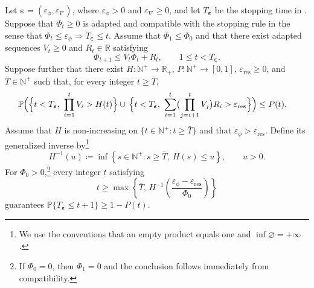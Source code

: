 \documentclass{article}
\begin{document}
\begin{theorem}
\label{Big_threorem}
Let
\(\boldsymbol\varepsilon=(\varepsilon_\phi,\varepsilon_\nabla)\), where
\(\varepsilon_\phi>0\) and \(\varepsilon_\nabla\ge0\), and let
\(T_{\boldsymbol\varepsilon}\) be the stopping time in
.  Suppose that \(\Phi_t\ge0\) is adapted and
compatible with the stopping rule in the sense that
$\Phi_t\le\varepsilon_\phi
\Longrightarrow
T_{\boldsymbol\varepsilon}\le t$.
Assume that \(\Phi_1\le\Phi_0\) and that there exist adapted sequences
\(V_t\ge0\) and \(R_t\in\mathbb R\) satisfying
\begin{equation}\label{eq:abstract_one_step}
\Phi_{t+1}\le V_t\Phi_t+R_t,
\qquad 1\le t<T_{\boldsymbol\varepsilon}.
\end{equation}
Suppose further that there exist
\(H\colon \mathbb N^+\to\mathbb R_+\),
\(P\colon \mathbb N^+\to[0,1]\),
\(\varepsilon_{\mathrm{res}}\ge0\), and
\(\bar T\in\mathbb N^+\) such that, for every integer
\(t\ge\bar T\),
\begin{equation}\label{eq:abstract_tail_event}
\begin{aligned}
\mathbb P\Bigl(&
\Bigl\{
 t<T_{\boldsymbol\varepsilon},\
 \prod_{i=1}^tV_i>H(t)
\Bigr\}\cup\,
\Bigl\{
 t<T_{\boldsymbol\varepsilon},\
 \sum_{i=1}^t
 \bigl(\prod_{j=i+1}^tV_j\bigr)R_i
 >\varepsilon_{\mathrm{res}}
\Bigr\}
\Bigr)
\le P(t).
\end{aligned}
\end{equation}
Assume that \(H\) is non-increasing on
\(\{t\in\mathbb N^+:t\ge\bar T\}\) and that
\(\varepsilon_\phi>\varepsilon_{\mathrm{res}}\). Define its generalized
inverse by\footnote{We use the conventions that an empty product equals
one and \(\inf\varnothing=+\infty\).}
\begin{equation}\label{eq:abstract_inverse_H}
H^{-1}(u)
\coloneqq 
\inf\left\{
s\in\mathbb N^+:
s\ge\bar T,\ H(s)\le u
\right\},
\qquad u>0.
\end{equation}
For \(\Phi_0>0\),\footnote{If
\(\Phi_0=0\), then \(\Phi_1=0\) and the conclusion follows immediately
from compatibility.} every integer \(t\) satisfying
\begin{equation}\label{eq:abstract_complexity_inverse}
t\ge\max\left\{
\bar T,\,
H^{-1}\!\left(
\frac{\varepsilon_\phi-\varepsilon_{\mathrm{res}}}{\Phi_0}
\right)
\right\}
\end{equation}
guarantees
\(\mathbb P\{T_{\boldsymbol\varepsilon}\leq t+1\}\geq1-P(t)\).

\end{theorem}
\end{document}
